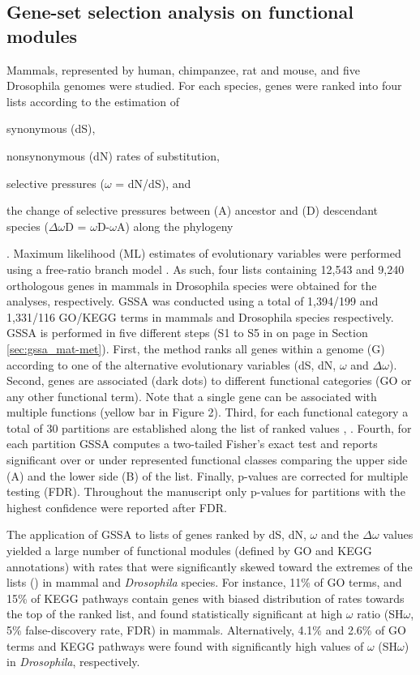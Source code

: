 \subsection{Gene-set selection analysis on functional modules}

Mammals, represented by human, chimpanzee, rat and mouse, and five Drosophila genomes were studied. For each species, genes were ranked into four lists according to the estimation of \begin{inparaenum}[i\upshape-] \item synonymous (dS), \item nonsynonymous (dN) rates of substitution, \item selective pressures ($\omega$ = dN/dS), and \item the change of selective pressures between (A) ancestor and (D) descendant species ($\Delta\omega$D = $\omega$D-$\omega$A) along the phylogeny \end{inparaenum}. Maximum likelihood (ML) estimates of evolutionary variables were performed using a free-ratio branch model \cite{Yang2007}. As such, four lists containing 12,543 and 9,240 orthologous genes in mammals in Drosophila species were obtained for the analyses, respectively. GSSA was conducted using a total of 1,394/199 and 1,331/116 GO/KEGG terms in mammals and Drosophila species respectively. GSSA is performed in five different steps (S1 to S5 in  on page \pageref{fig:gssa_met} in Section \ref{sec:gssa_mat-met}). First, the method ranks all genes within a genome (G) according to one of the alternative evolutionary variables (dS, dN, $\omega$ and $\Delta\omega$). Second, genes are associated (dark dots) to different functional categories (GO or any other functional term). Note that a single gene can be associated with multiple functions (yellow bar in Figure 2). Third, for each functional category a total of 30 partitions are established along the list of ranked values \cite{Al-Shahrour2007}, \cite{Al-Shahrour2005a}. Fourth, for each partition GSSA computes a two-tailed Fisher's exact test and reports significant over or under represented functional classes comparing the upper side (A) and the lower side (B) of the list. Finally, p-values are corrected for multiple testing (FDR). Throughout the manuscript only p-values for partitions with the highest confidence were reported after FDR.

The application of GSSA to lists of genes ranked by dS, dN, $\omega$ and the $\Delta\omega$ values yielded a large number of functional modules (defined by GO and KEGG annotations) with rates that were significantly skewed toward the extremes of the lists () in mammal and \textit{Drosophila} species. For instance, 11\% of GO terms, and 15\% of KEGG pathways contain genes with biased distribution of rates towards the top of the ranked list, and found statistically significant at high $\omega$ ratio (SH$\omega$, 5\% false-discovery rate, FDR) in mammals. Alternatively, 4.1\% and 2.6\% of GO terms and KEGG pathways were found with significantly high values of $\omega$ (SH$\omega$) in \textit{Drosophila}, respectively.

